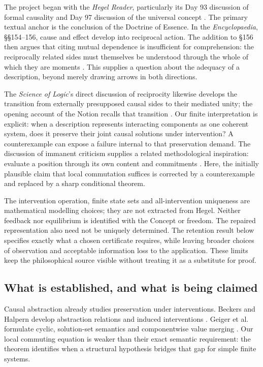 \documentclass[11pt,a4paper]{article}
\theoremstyle{definition}
\theoremstyle{remark}
\begin{document}
The project began with the \emph{Hegel Reader}, particularly its Day 93 discussion of formal causality and Day 97 discussion of the universal concept \cite{reader}. The primary textual anchor is the conclusion of the Doctrine of Essence. In the \emph{Encyclopaedia}, \S\S154--156, cause and effect develop into reciprocal action. The addition to \S156 then argues that citing mutual dependence is insufficient for comprehension: the reciprocally related sides must themselves be understood through the whole of which they are moments \cite{hegel-encyclopaedia}. This supplies a question about the adequacy of a description, beyond merely drawing arrows in both directions.

The \emph{Science of Logic}'s direct discussion of reciprocity likewise develops the transition from externally presupposed causal sides to their mediated unity; the opening account of the Notion recalls that transition \cite{hegel-reciprocity,hegel-logic}. Our finite interpretation is explicit: when a description represents interacting components as one coherent system, does it preserve their joint causal solutions under intervention? A counterexample can expose a failure internal to that preservation demand. The discussion of immanent criticism supplies a related methodological inspiration: evaluate a position through its own content and commitments \cite{hegel-logic}. Here, the initially plausible claim that local commutation suffices is corrected by a counterexample and replaced by a sharp conditional theorem.

The intervention operation, finite state sets and all-intervention uniqueness are mathematical modelling choices; they are not extracted from Hegel. Neither feedback nor equilibrium is identified with the Concept or freedom. The repaired representation also need not be uniquely determined. The retention result below specifies exactly what a chosen certificate requires, while leaving broader choices of observation and acceptable information loss to the application. These limits keep the philosophical source visible without treating it as a substitute for proof.

\subsection{What is established, and what is being claimed}

Causal abstraction already studies preservation under interventions. Beckers and Halpern develop abstraction relations and induced interventions \cite{beckers-halpern}. Geiger et al. formulate cyclic, solution-set semantics and componentwise value merging \cite{geiger}. Our local commuting equation is weaker than their exact semantic requirement: the theorem identifies when a structural hypothesis bridges that gap for simple finite systems.
\end{document}
